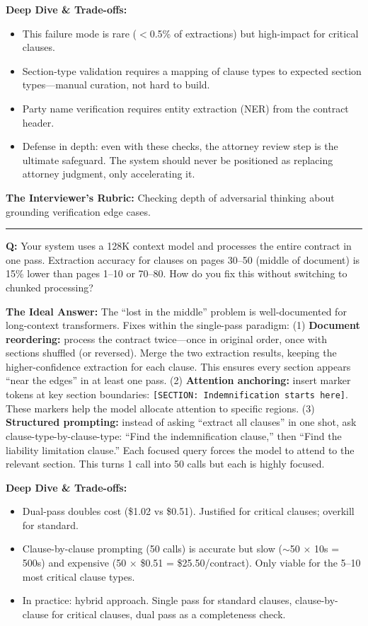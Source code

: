 \textbf{Deep Dive \& Trade-offs:}
\begin{itemize}
  \item This failure mode is rare ($<$0.5\% of extractions) but high-impact for critical clauses.
  \item Section-type validation requires a mapping of clause types to expected section types---manual curation, not hard to build.
  \item Party name verification requires entity extraction (NER) from the contract header.
  \item Defense in depth: even with these checks, the attorney review step is the ultimate safeguard. The system should never be positioned as replacing attorney judgment, only accelerating it.
\end{itemize}

\textbf{The Interviewer's Rubric:} Checking depth of adversarial thinking about grounding verification edge cases.

\bigskip\hrule\bigskip

\textbf{Q:} Your system uses a 128K context model and processes the entire contract in one pass. Extraction accuracy for clauses on pages 30--50 (middle of document) is 15\% lower than pages 1--10 or 70--80. How do you fix this without switching to chunked processing?

\textbf{The Ideal Answer:} The ``lost in the middle'' problem is well-documented for long-context transformers. Fixes within the single-pass paradigm: (1) \textbf{Document reordering:} process the contract twice---once in original order, once with sections shuffled (or reversed). Merge the two extraction results, keeping the higher-confidence extraction for each clause. This ensures every section appears ``near the edges'' in at least one pass. (2) \textbf{Attention anchoring:} insert marker tokens at key section boundaries: \texttt{[SECTION: Indemnification starts here]}. These markers help the model allocate attention to specific regions. (3) \textbf{Structured prompting:} instead of asking ``extract all clauses'' in one shot, ask clause-type-by-clause-type: ``Find the indemnification clause,'' then ``Find the liability limitation clause.'' Each focused query forces the model to attend to the relevant section. This turns 1 call into 50 calls but each is highly focused.

\textbf{Deep Dive \& Trade-offs:}
\begin{itemize}
  \item Dual-pass doubles cost (\$1.02 vs \$0.51). Justified for critical clauses; overkill for standard.
  \item Clause-by-clause prompting (50 calls) is accurate but slow ($\sim$50 $\times$ 10s = 500s) and expensive (50 $\times$ \$0.51 = \$25.50/contract). Only viable for the 5--10 most critical clause types.
  \item In practice: hybrid approach. Single pass for standard clauses, clause-by-clause for critical clauses, dual pass as a completeness check.
\end{itemize}

